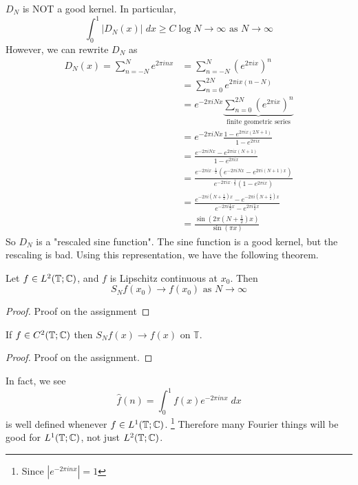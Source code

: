 \begin{rem}
    $D_N$ is NOT a good kernel. In particular, 
    \[
        \int_0^1 |D_N(x)| \; dx \geq C \log N \to \infty \text{ as } N \to \infty
    \]  
    However, we can rewrite $D_N$ as
    \begin{align*}
        D_N(x) = \sum_{n = -N}^N e^{2 \pi i n x}  &= \sum_{n = -N}^N \left(e^{2 \pi i x}\right)^n\\
        &= \sum_{n = 0}^{2N} e^{2 \pi i x (n - N)} \\
        &= e^{-2 \pi i N x} \underbrace{\sum_{n = 0}^{2N} \left(e^{2 \pi i x}\right)^n}_{\text{finite geometric series}} \\
        &= e^{-2 \pi i N x} \frac{1 - e^{2 \pi i x (2N + 1)}}{1 - e^{2 \pi i x}} \\
        &= \frac{e^{-2 \pi i N x} - e^{2 \pi i x (N + 1)}}{1 - e^{2 \pi i x}} \\
        &= \frac{e^{-2 \pi i x \cdot \frac{1}{2}} \left( e^{-2 \pi i N x } - e^{2 \pi i (N + 1) x } \right)}{e^{-2 \pi i x \cdot \frac{1}{2}}\left(1 - e^{2 \pi i x}\right)} \\
        &= \frac{e^{-2 \pi i (N + \frac{1}{2}) x} - e^{-2 \pi i (N + \frac{1}{2}) x}}{e^{-2 \pi i \frac{1}{2} x} - e^{2 \pi i \frac{1}{2} x}} \\
        &= \frac{\sin(2 \pi (N + \frac{1}{2} )x)}{\sin(\pi x)}
    \end{align*}
    So $D_N$ is a "rescaled sine function". The sine function is a good kernel, but the rescaling is bad.
    Using this representation, we have the following theorem.
\end{rem}

\begin{thm}
    Let $f \in L^2(\mathbb{T}; \mathbb{C})$, and $f$ is Lipschitz continuous at $x_0$. Then
    \[
        S_N f(x_0) \to f(x_0) \text{ as } N \to \infty
    \]   
\end{thm}
\begin{proof}
    Proof on the assignment
\end{proof}
\begin{thm}
    If $f \in C^2(\mathbb{T}; \mathbb{C})$ then $S_N f (x) \to f(x)$  on $\mathbb{T}$.   
\end{thm}
\begin{proof}
    Proof on the assignment.
\end{proof}

\begin{rem}
    In fact, we see
    \[
        \hat{f}(n) = \int_0^1 f(x) e^{-2 \pi i n x} \; dx
    \]
    is well defined whenever $f \in L^1(\mathbb{T}; \mathbb{C})$. \footnote{Since $|e^{-2 \pi i n x}| = 1$}
    Therefore many Fourier things will be good for $L^1(\mathbb{T}; \mathbb{C})$, not just $L^2(\mathbb{T}; \mathbb{C})$. 
\end{rem}

